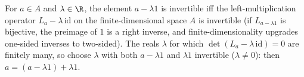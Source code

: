 For $a \in A$ and $\lambda \in \R$, the element $a - \lambda 1$ is invertible iff the left-multiplication operator $L_a - \lambda\, \mathrm{id}$ on the finite-dimensional space $A$ is invertible (if $L_{a - \lambda 1}$ is bijective, the preimage of $1$ is a right inverse, and finite-dimensionality upgrades one-sided inverses to two-sided). The reals $\lambda$ for which $\det(L_a - \lambda\,\mathrm{id}) = 0$ are finitely many, so choose $\lambda$ with both $a - \lambda 1$ and $\lambda 1$ invertible ($\lambda \neq 0$): then $a = (a - \lambda 1) + \lambda 1$.
